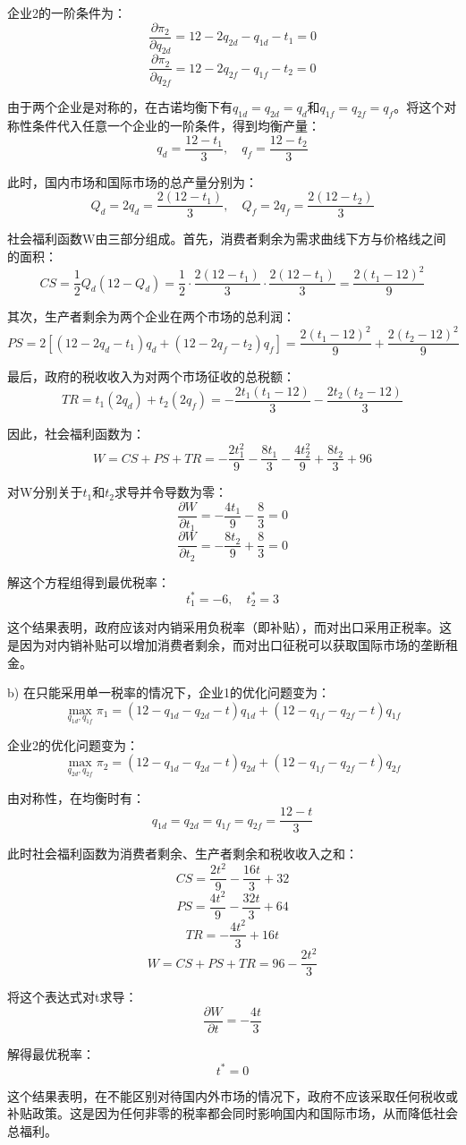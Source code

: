 \documentclass[12pt]{article}
\begin{document}
企业2的一阶条件为：
\[\frac{\partial \pi_2}{\partial q_{2d}} = 12-2q_{2d}-q_{1d}-t_1 = 0\]
\[\frac{\partial \pi_2}{\partial q_{2f}} = 12-2q_{2f}-q_{1f}-t_2 = 0\]

由于两个企业是对称的，在古诺均衡下有$q_{1d}=q_{2d}=q_d$和$q_{1f}=q_{2f}=q_f$。将这个对称性条件代入任意一个企业的一阶条件，得到均衡产量：
\[q_d = \frac{12-t_1}{3}, \quad q_f = \frac{12-t_2}{3}\]

此时，国内市场和国际市场的总产量分别为：
\[Q_d = 2q_d = \frac{2(12-t_1)}{3}, \quad Q_f = 2q_f = \frac{2(12-t_2)}{3}\]

社会福利函数W由三部分组成。首先，消费者剩余为需求曲线下方与价格线之间的面积：
\[CS = \frac{1}{2}Q_d(12-Q_d) = \frac{1}{2}\cdot\frac{2(12-t_1)}{3}\cdot\frac{2(12-t_1)}{3} = \frac{2(t_1-12)^2}{9}\]

其次，生产者剩余为两个企业在两个市场的总利润：
\[PS = 2[(12-2q_d-t_1)q_d + (12-2q_f-t_2)q_f] = \frac{2(t_1-12)^2}{9} + \frac{2(t_2-12)^2}{9}\]

最后，政府的税收收入为对两个市场征收的总税额：
\[TR = t_1(2q_d) + t_2(2q_f) = -\frac{2t_1(t_1-12)}{3} - \frac{2t_2(t_2-12)}{3}\]

因此，社会福利函数为：
\[W = CS + PS + TR = -\frac{2t_1^2}{9} - \frac{8t_1}{3} - \frac{4t_2^2}{9} + \frac{8t_2}{3} + 96\]

对W分别关于$t_1$和$t_2$求导并令导数为零：
\[\frac{\partial W}{\partial t_1} = -\frac{4t_1}{9} - \frac{8}{3} = 0\]
\[\frac{\partial W}{\partial t_2} = -\frac{8t_2}{9} + \frac{8}{3} = 0\]

解这个方程组得到最优税率：
\[t_1^* = -6, \quad t_2^* = 3\]

这个结果表明，政府应该对内销采用负税率（即补贴），而对出口采用正税率。这是因为对内销补贴可以增加消费者剩余，而对出口征税可以获取国际市场的垄断租金。

b) 在只能采用单一税率的情况下，企业1的优化问题变为：
\[\max_{q_{1d},q_{1f}} \pi_1 = (12-q_{1d}-q_{2d}-t)q_{1d} + (12-q_{1f}-q_{2f}-t)q_{1f}\]

企业2的优化问题变为：
\[\max_{q_{2d},q_{2f}} \pi_2 = (12-q_{1d}-q_{2d}-t)q_{2d} + (12-q_{1f}-q_{2f}-t)q_{2f}\]

由对称性，在均衡时有：
\[q_{1d} = q_{2d} = q_{1f} = q_{2f} = \frac{12-t}{3}\]

此时社会福利函数为消费者剩余、生产者剩余和税收收入之和：
\[CS = \frac{2t^2}{9} - \frac{16t}{3} + 32\]
\[PS = \frac{4t^2}{9} - \frac{32t}{3} + 64\]
\[TR = -\frac{4t^2}{3} + 16t\]
\[W = CS + PS + TR = 96 - \frac{2t^2}{3}\]

将这个表达式对t求导：
\[\frac{\partial W}{\partial t} = -\frac{4t}{3}\]

解得最优税率：
\[t^* = 0\]

这个结果表明，在不能区别对待国内外市场的情况下，政府不应该采取任何税收或补贴政策。这是因为任何非零的税率都会同时影响国内和国际市场，从而降低社会总福利。
\end{document}
